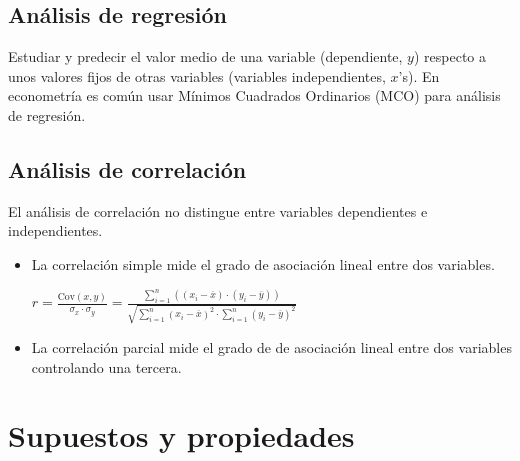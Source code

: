 \documentclass[10pt, a4paper, landscape]{extarticle}
\newcommand{\Cov}{\mathrm{Cov}}
\begin{document}
\begin{multicols}{3}
	\subsection*{Análisis de regresión}
		Estudiar y predecir el valor medio de una variable (dependiente, $y$) respecto a unos valores fijos de otras variables (variables independientes, $x$'s). En econometría es común usar Mínimos Cuadrados Ordinarios (MCO) para análisis de regresión.
	\subsection*{Análisis de correlación}
		El análisis de correlación no distingue entre variables dependientes e independientes.
		\begin{itemize}[leftmargin=*]
			\item La correlación simple mide el grado de asociación lineal entre dos variables.
			\begin{center}
				$r = \frac{\Cov(x,y)}{\sigma_x \cdot \sigma_y} = \frac{\sum_{i=1}^n ((x_i - \overline{x}) \cdot (y_i - \overline{y}))}{\sqrt{\sum_{i=1}^n (x_i - \overline{x})^2 \cdot \sum_{i=1}^n (y_i - \overline{y})^2}}$
			\end{center}
			\item La correlación parcial mide el grado de de asociación lineal entre dos variables controlando una tercera.
		\end{itemize}
\columnbreak
\section*{Supuestos y propiedades}

\end{multicols}
\end{document}
